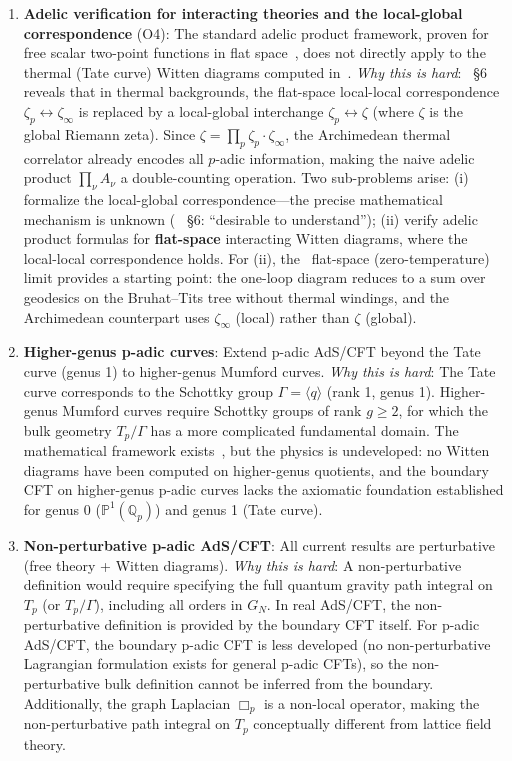 \documentclass[11pt,a4paper]{article}
\newcommand{\Qp}{\mathbb{Q}_p}
\newcommand{\Pone}{\mathbb{P}^1}
\newcommand{\Tp}{T_p}
\newcommand{\Boxp}{\Box_p}
\newcommand{\BirTits}{Bruhat--Tits}
\begin{document}
\begin{enumerate}[leftmargin=2em]
    \item \textbf{Adelic verification for interacting theories and the local-global correspondence} (O4): The standard adelic product framework, proven for free scalar two-point functions in flat space~\cite{HSYZ20}, does not directly apply to the thermal (Tate curve) Witten diagrams computed in~\cite{HJ24}. \textit{Why this is hard}:~\cite{HJ24} \S6 reveals that in thermal backgrounds, the flat-space local-local correspondence $\zeta_p \leftrightarrow \zeta_\infty$ is replaced by a local-global interchange $\zeta_p \leftrightarrow \zeta$ (where $\zeta$ is the global Riemann zeta). Since $\zeta = \prod_p \zeta_p \cdot \zeta_\infty$, the Archimedean thermal correlator already encodes all $p$-adic information, making the naive adelic product $\prod_\nu A_\nu$ a double-counting operation. Two sub-problems arise: (i) formalize the local-global correspondence---the precise mathematical mechanism is unknown (~\cite{HJ24} \S6: ``desirable to understand''); (ii) verify adelic product formulas for \textbf{flat-space} interacting Witten diagrams, where the local-local correspondence holds. For (ii), the~\cite{HJ24} flat-space (zero-temperature) limit provides a starting point: the one-loop diagram reduces to a sum over geodesics on the \BirTits{} tree without thermal windings, and the Archimedean counterpart uses $\zeta_\infty$ (local) rather than $\zeta$ (global).

    \item \textbf{Higher-genus p-adic curves}: Extend p-adic AdS/CFT beyond the Tate curve (genus 1) to higher-genus Mumford curves. \textit{Why this is hard}: The Tate curve corresponds to the Schottky group $\Gamma = \langle q \rangle$ (rank 1, genus 1). Higher-genus Mumford curves require Schottky groups of rank $g \geq 2$, for which the bulk geometry $\Tp/\Gamma$ has a more complicated fundamental domain. The mathematical framework exists~\cite{Mum72}, but the physics is undeveloped: no Witten diagrams have been computed on higher-genus quotients, and the boundary CFT on higher-genus p-adic curves lacks the axiomatic foundation established for genus 0 ($\Pone(\Qp)$) and genus 1 (Tate curve).

    \item \textbf{Non-perturbative p-adic AdS/CFT}: All current results are perturbative (free theory + Witten diagrams). \textit{Why this is hard}: A non-perturbative definition would require specifying the full quantum gravity path integral on $\Tp$ (or $\Tp/\Gamma$), including all orders in $G_N$. In real AdS/CFT, the non-perturbative definition is provided by the boundary CFT itself. For p-adic AdS/CFT, the boundary p-adic CFT is less developed (no non-perturbative Lagrangian formulation exists for general p-adic CFTs), so the non-perturbative bulk definition cannot be inferred from the boundary. Additionally, the graph Laplacian $\Boxp$ is a non-local operator, making the non-perturbative path integral on $\Tp$ conceptually different from lattice field theory.
\end{enumerate}
\end{document}
